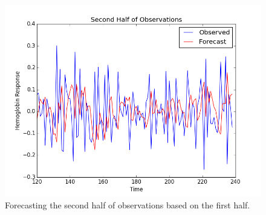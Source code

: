 \begin{figure}[ht]
\centering
\includegraphics[scale=0.5]{images/ts-preds.png}
\caption{Forecasting the second half of observations based on the first half.}
\label{fig:ts-preds}
\end{figure}

